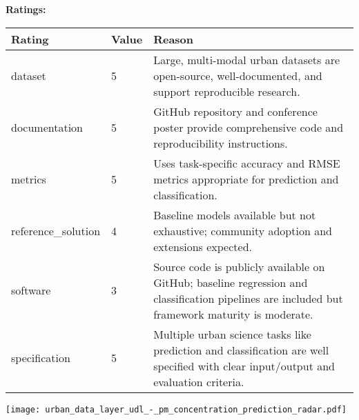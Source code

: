 {{{\bf Ratings:} ~ \\

\begin{tabular}{p{} p{} p{}}
\hline
Rating & Value & Reason \\
\hline
dataset & 5 & Large, multi-modal urban datasets are open-source, well-documented, and support
reproducible research.
 \\
documentation & 5 & GitHub repository and conference poster provide comprehensive code and reproducibility
instructions.
 \\
metrics & 5 & Uses task-specific accuracy and RMSE metrics appropriate for prediction and classification.
 \\
reference\_solution & 4 & Baseline models available but not exhaustive; community adoption and extensions expected.
 \\
software & 3 & Source code is publicly available on GitHub; baseline regression and classification
pipelines are included but framework maturity is moderate.
 \\
specification & 5 & Multiple urban science tasks like prediction and classification are well specified
with clear input/output and evaluation criteria.
 \\
\hline
\end{tabular}

\texttt{[image: urban\_data\_layer\_udl\_-\_pm\_concentration\_prediction\_radar.pdf]}
}}
\clearpage